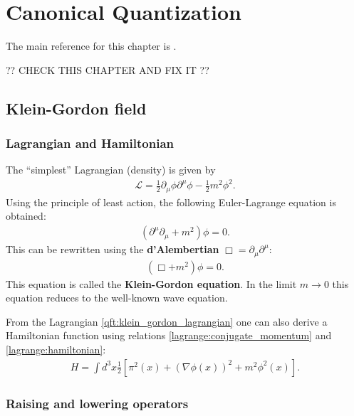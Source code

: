 \chapter{Canonical Quantization}

    The main reference for this chapter is \cite{Peskin}.

    ?? CHECK THIS CHAPTER AND FIX IT ??

\section{Klein-Gordon field}
\subsection{Lagrangian and Hamiltonian}

    The ``simplest'' Lagrangian (density) is given by
    \begin{gather}
        \label{qft:klein_gordon_lagrangian}
        \mathcal{L} = \frac{1}{2}\partial_\mu\phi\partial^\mu\phi - \frac{1}{2}m^2\phi^2.
    \end{gather}
    Using the principle of least action, the following Euler-Lagrange equation is obtained:
    \begin{gather}
        \left(\partial^\mu\partial_\mu + m^2\right)\phi = 0.
    \end{gather}
    This can be rewritten using the \textbf{d'Alembertian} $\Box = \partial_\mu\partial^\mu$:
    \begin{gather}
        \label{qft:klein_gordon_equation}
        (\Box+m^2)\phi = 0.
    \end{gather}
    This equation is called the \textbf{Klein-Gordon equation}. In the limit $m\rightarrow0$ this equation reduces to the well-known wave equation.

    From the Lagrangian \eqref{qft:klein_gordon_lagrangian} one can also derive a Hamiltonian function using relations \ref{lagrange:conjugate_momentum} and \ref{lagrange:hamiltonian}:
    \begin{gather}
        \label{qft:klein_gordon_hamiltonian}
        H = \int d^3x\frac{1}{2}\left[\pi^2(x) + (\nabla\phi(x))^2 + m^2\phi^2(x)\right].
    \end{gather}

\subsection{Raising and lowering operators}

